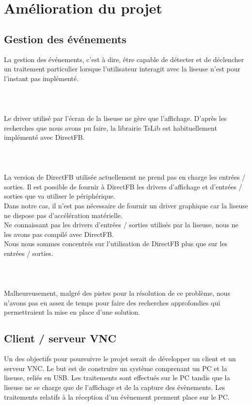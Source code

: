 \chapter{Amélioration du projet}


\section{Gestion des événements}
La gestion des événements, c'est à dire, être capable de détecter et de déclencher un traitement particulier lorsque l'utilisateur interagit avec la liseuse n'est pour l'instant pas implémenté.
\paragraph*{~}
Le driver utilisé par l'écran de la liseuse ne gère que l'affichage. D'après les recherches que nous avons pu faire, la librairie TsLib est habituellement implémenté avec DirectFB.
\paragraph*{~}
La version de DirectFB utilisée actuellement ne prend pas en charge les entrées / sorties. Il est possible de fournir à DirectFB les drivers d'affichage et d'entrées / sorties que va utiliser le périphérique.\\Dans notre cas, il n'est pas nécessaire de fournir un driver graphique car la liseuse ne dispose pas d'accélération matérielle.\\Ne connaissant pas les drivers d'entrées / sorties utilisés par la liseuse, nous ne les avons pas compilé avec DirectFB.\\Nous nous sommes concentrés sur l'utilisation de DirectFB plus que sur les entrées / sorties.
\paragraph*{~}
Malheureusement, malgré des pistes pour la résolution de ce problème, nous n'avons pas eu assez de temps pour faire des recherches approfondies qui permettraient la mise en place d'une solution.


\section{Client / serveur VNC}

Un des objectifs pour poursuivre le projet serait de développer un client et un serveur VNC. 
Le but est de construire un système comprenant un PC et la liseuse, reliés en USB. Les traitements sont effectués sur le PC tandis que la liseuse ne se charge que de l'affichage et de la capture des évènements. Les traitements relatifs à la réception d'un évènement prennent place sur le PC.

